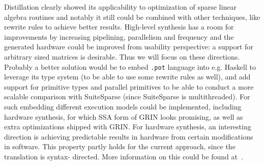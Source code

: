 Distillation clearly showed its applicability to optimization of sparse linear algebra routines and notably it still could be combined with other techniques, like rewrite rules to achieve better results. High-level synthesis has a room for improvements by increasing pipelining, parallelism and frequency and the generated hardware could be improved from usability perspective: a support for arbitrary sized matrices is desirable. Thus we will focus on these directions. Probably a better solution would be to embed \texttt{.pot} language into e.g. Haskell to leverage its type system (to be able to use some rewrite rules as well), and add support for primitive types and parallel primitives to be able to conduct a more scalable comparison with SuiteSparse (since SuiteSparse is multithreaded). For such embedding different execution models could be implemented, including hardware synthesis, for which SSA form of GRIN looks promising, as well as extra optimizations shipped with GRIN. For hardware synthesis, an interesting direction is achieving predictable results in hardware from certain modifications in software. This property partly holds for the current approach, since the translation is syntax- directed. More information on this could be found at~\cite{predict}.

\pagebreak

